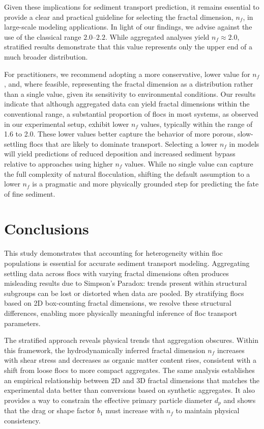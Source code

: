 \documentclass{agujournal2019}
\begin{document}
Given these implications for sediment transport prediction, it remains essential to provide a clear and practical guideline for selecting the fractal dimension, \( n_f \), in large-scale modeling applications. In light of our findings, we advise against the use of the classical range \( 2.0\text{--}2.2 \). While aggregated analyses yield \( n_f \approx 2.0 \), stratified results demonstrate that this value represents only the upper end of a much broader distribution.

For practitioners, we recommend adopting a more conservative, lower value for \( n_f \), and, where feasible, representing the fractal dimension as a distribution rather than a single value, given its sensitivity to environmental conditions. Our results indicate that although aggregated data can yield fractal dimensions within the conventional range, a substantial proportion of flocs in most systems, as observed in our experimental setup, exhibit lower \( n_f \) values, typically within the range of 1.6 to 2.0. These lower values better capture the behavior of more porous, slow-settling flocs that are likely to dominate transport. Selecting a lower \( n_f \) in models will yield predictions of reduced deposition and increased sediment bypass relative to approaches using higher \( n_f \) values. While no single value can capture the full complexity of natural flocculation, shifting the default assumption to a lower \( n_f \) is a pragmatic and more physically grounded step for predicting the fate of fine sediment.

\section{Conclusions}

This study demonstrates that accounting for heterogeneity within floc populations is essential for accurate sediment transport modeling. Aggregating settling data across flocs with varying fractal dimensions often produces misleading results due to Simpson’s Paradox: trends present within structural subgroups can be lost or distorted when data are pooled. By stratifying flocs based on 2D box-counting fractal dimensions, we resolve these structural differences, enabling more physically meaningful inference of floc transport parameters.

The stratified approach reveals physical trends that aggregation obscures. Within this framework, the hydrodynamically inferred fractal dimension \(n_f\) increases with shear stress and decreases as organic matter content rises, consistent with a shift from loose flocs to more compact aggregates. The same analysis establishes an empirical relationship between 2D and 3D fractal dimensions that matches the experimental data better than conversions based on synthetic aggregates. It also provides a way to constrain the effective primary particle diameter \(d_p\) and shows that the drag or shape factor \(b_1\) must increase with \(n_f\) to maintain physical consistency.
\end{document}
